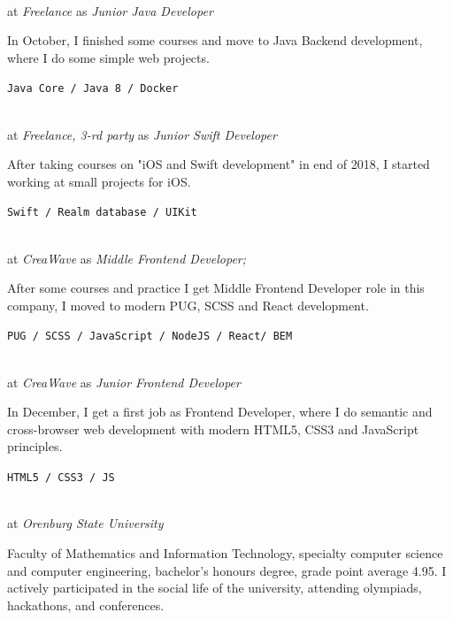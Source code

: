 \Sep




 \\
at \textit{Freelance}
as \textit{Junior Java Developer}
\SmallSep

In October, I finished some courses and move to Java Backend development, where I do some simple web projects.
\SmallSep

\texttt{Java Core / Java 8 / Docker}
\SmallSep

 \\
at \textit{Freelance, 3-rd party}
as \textit{Junior Swift Developer}
\SmallSep

After taking courses on "iOS and Swift development" in end of 2018, I started working at small projects for iOS.
\SmallSep

\texttt{Swift / Realm database / UIKit}
\SmallSep

 \\
at \textit{CreaWave}
as \textit{Middle Frontend Developer;}
\SmallSep

After some courses and practice I get Middle Frontend Developer role in this company, I moved to modern PUG, SCSS and React development.
\SmallSep

\texttt{PUG / SCSS / JavaScript / NodeJS / React/ BEM }
\SmallSep

 \\
at \textit{CreaWave}
as \textit{Junior Frontend Developer}
\SmallSep

In December, I get a first job as Frontend Developer, where I do semantic and cross-browser web development with modern HTML5,  CSS3 and JavaScript principles.
\SmallSep

\texttt{HTML5 / CSS3 / JS}

\clearpage
\framebreak
\framebreak



 \\
at \textit {Orenburg State University}

\SmallSep

Faculty of Mathematics and Information Technology, specialty computer science and computer engineering,  bachelor's honours degree, grade point average 4.95. I actively participated in the social life of the university, attending olympiads, hackathons, and conferences.

